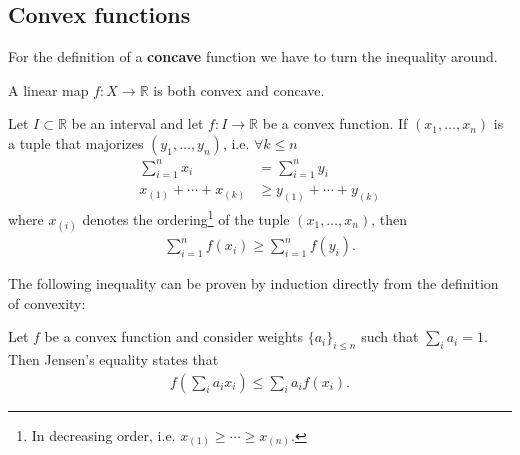 \subsection{Convex functions}


    \begin{remark}
        For the definition of a \textbf{concave} function we have to turn the inequality around.
    \end{remark}
    \begin{result}
        A linear map $f:X\rightarrow\mathbb{R}$ is both convex and concave.
    \end{result}

    \begin{theorem}
        Let $I\subset\mathbb{R}$ be an interval and let $f:I\rightarrow\mathbb{R}$ be a convex function. If $(x_1, \ldots, x_n)$ is a tuple that majorizes $(y_1, \ldots, y_n)$, i.e. $\forall k\leq n$
        \begin{align}
            \sum_{i=1}^nx_i &= \sum_{i=1}^ny_i\\
            x_{(1)} + \cdots + x_{(k)}&\geq y_{(1)} + \cdots + y_{(k)}
        \end{align}
        where $x_{(i)}$ denotes the ordering\footnote{In decreasing order, i.e. $x_{(1)}\geq\cdots\geq x_{(n)}$.} of the tuple $(x_1, \ldots, x_n)$, then
        \begin{gather}
            \sum_{i=1}^nf(x_i)\geq \sum_{i=1}^nf(y_i).
        \end{gather}
    \end{theorem}
    The following inequality can be proven by induction directly from the definition of convexity:
    \begin{theorem}
        Let $f$ be a convex function and consider weights $\{a_i\}_{i\leq n}$ such that $\sum_ia_i=1$. Then Jensen's equality states that
        \begin{gather}
            \label{linalgebra:jensen_inequality}
            f\left(\sum_ia_ix_i\right) \leq \sum_ia_if(x_i).
        \end{gather}
    \end{theorem}